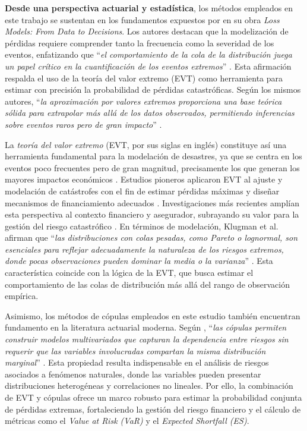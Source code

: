 \documentclass[12pt, a4paper]{article}
\begin{document}
\textbf{Desde una perspectiva actuarial y estadística}, los métodos empleados en este trabajo se sustentan en los fundamentos expuestos por  en su obra \textit{Loss Models: From Data to Decisions}. Los autores destacan que la modelización de pérdidas requiere comprender tanto la frecuencia como la severidad de los eventos, enfatizando que “\textit{el comportamiento de la cola de la distribución juega un papel crítico en la cuantificación de los eventos extremos}” \cite[p. 412]{Klugman2019}. Esta afirmación respalda el uso de la teoría del valor extremo (EVT) como herramienta para estimar con precisión la probabilidad de pérdidas catastróficas. Según los mismos autores, “\textit{la aproximación por valores extremos proporciona una base teórica sólida para extrapolar más allá de los datos observados, permitiendo inferencias sobre eventos raros pero de gran impacto}” \cite[p. 415]{Klugman2019}.

La \textit{teoría del valor extremo} (EVT, por sus siglas en inglés) constituye así una herramienta fundamental para la modelación de desastres, ya que se centra en los eventos poco frecuentes pero de gran magnitud, precisamente los que generan los mayores impactos económicos \cite{Siddiqui2022}. Estudios pioneros aplicaron EVT al ajuste y modelación de catástrofes con el fin de estimar pérdidas máximas y diseñar mecanismos de financiamiento adecuados \cite{PerezGarcia2004}. Investigaciones más recientes amplían esta perspectiva al contexto financiero y asegurador, subrayando su valor para la gestión del riesgo catastrófico \cite{DelfinerGutierrez2025}. En términos de modelación, Klugman et al. afirman que “\textit{las distribuciones con colas pesadas, como Pareto o lognormal, son esenciales para reflejar adecuadamente la naturaleza de los riesgos extremos, donde pocas observaciones pueden dominar la media o la varianza}” \cite[p. 260]{Klugman2019}. Esta característica coincide con la lógica de la EVT, que busca estimar el comportamiento de las colas de distribución más allá del rango de observación empírica.

Asimismo, los métodos de cópulas empleados en este estudio también encuentran fundamento en la literatura actuarial moderna. Según , “\textit{las cópulas permiten construir modelos multivariados que capturan la dependencia entre riesgos sin requerir que las variables involucradas compartan la misma distribución marginal}” \cite[p. 489]{Klugman2019}. Esta propiedad resulta indispensable en el análisis de riesgos asociados a fenómenos naturales, donde las variables pueden presentar distribuciones heterogéneas y correlaciones no lineales. Por ello, la combinación de EVT y cópulas ofrece un marco robusto para estimar la probabilidad conjunta de pérdidas extremas, fortaleciendo la gestión del riesgo financiero y el cálculo de métricas como el \textit{Value at Risk (VaR)} y el \textit{Expected Shortfall (ES)}.
\end{document}
